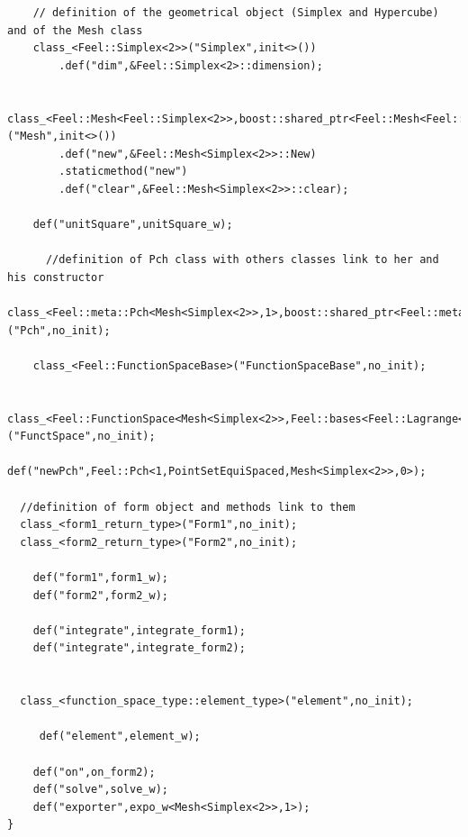 \documentclass[french,12pt]{article}
\begin{document}
\begin{lstlisting}
    // definition of the geometrical object (Simplex and Hypercube) and of the Mesh class 
    class_<Feel::Simplex<2>>("Simplex",init<>())
        .def("dim",&Feel::Simplex<2>::dimension);

    class_<Feel::Mesh<Feel::Simplex<2>>,boost::shared_ptr<Feel::Mesh<Feel::Simplex<2>>>,boost::noncopyable>("Mesh",init<>())
        .def("new",&Feel::Mesh<Simplex<2>>::New)
        .staticmethod("new")
        .def("clear",&Feel::Mesh<Simplex<2>>::clear);

    def("unitSquare",unitSquare_w);
       
      //definition of Pch class with others classes link to her and his constructor 
     class_<Feel::meta::Pch<Mesh<Simplex<2>>,1>,boost::shared_ptr<Feel::meta::Pch<Mesh<Simplex<2>>,1>>>("Pch",no_init);

    class_<Feel::FunctionSpaceBase>("FunctionSpaceBase",no_init);

    class_<Feel::FunctionSpace<Mesh<Simplex<2>>,Feel::bases<Feel::Lagrange<1,Feel::Scalar,Feel::Continuous,Feel::PointSetEquiSpaced,0>>,double,Feel::Periodicity<Feel::NoPeriodicity>,Feel::mortars<Feel::NoMortar>>,boost::shared_ptr<Feel::FunctionSpace<Mesh<Simplex<2>>,Feel::bases<Feel::Lagrange<1,Feel::Scalar,Feel::Continuous,Feel::PointSetEquiSpaced,0>>,double,Feel::Periodicity<Feel::NoPeriodicity>,Feel::mortars<Feel::NoMortar>>>,boost::python::bases<Feel::FunctionSpaceBase>>("FunctSpace",no_init);

def("newPch",Feel::Pch<1,PointSetEquiSpaced,Mesh<Simplex<2>>,0>); 
  
  //definition of form object and methods link to them 
  class_<form1_return_type>("Form1",no_init); 
  class_<form2_return_type>("Form2",no_init); 

    def("form1",form1_w);
    def("form2",form2_w);

    def("integrate",integrate_form1);
    def("integrate",integrate_form2);


  class_<function_space_type::element_type>("element",no_init);
    
     def("element",element_w);
    
    def("on",on_form2);
    def("solve",solve_w);
    def("exporter",expo_w<Mesh<Simplex<2>>,1>);
}
\end{lstlisting}
\end{document}
